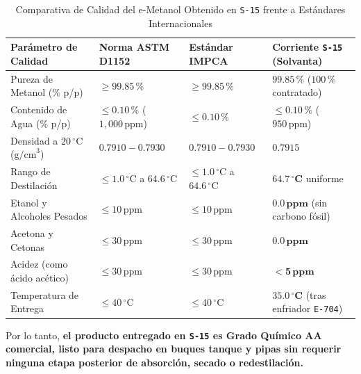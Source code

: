 \documentclass[11pt,a4paper]{article}
\begin{document}
\begin{table}[H]
\centering
\small
\caption{Comparativa de Calidad del e-Metanol Obtenido en \texttt{S-15} frente a Estándares Internacionales}
\label{tab:pureza_metanol}
\begin{tabular}{p{4.5cm} p{3.2cm} p{3.2cm} p{3.5cm}}
\toprule
\textbf{Parámetro de Calidad} & \textbf{Norma ASTM D1152} & \textbf{Estándar IMPCA} & \textbf{Corriente \texttt{S-15} (Solvanta)} \\
\midrule
Pureza de Metanol (\% p/p) & $\ge 99.85\,\%$ & $\ge 99.85\,\%$ & $\mathbf{99.85\,\%}$ ($100\,\%$ contratado) \\
Contenido de Agua (\% p/p) & $\le 0.10\,\%$ ($1{,}000\,\text{ppm}$) & $\le 0.10\,\%$ & $\mathbf{\le 0.10\,\%}$ ($950\,\text{ppm}$) \\
Densidad a $20\,^\circ\text{C}$ ($\text{g/cm}^3$) & $0.7910 - 0.7930$ & $0.7910 - 0.7930$ & $\mathbf{0.7915}$ \\
Rango de Destilación & $\le 1.0\,^\circ\text{C}$ a $64.6\,^\circ\text{C}$ & $\le 1.0\,^\circ\text{C}$ a $64.6\,^\circ\text{C}$ & $\mathbf{64.7\,^\circ\text{C}}$ uniforme \\
Etanol y Alcoholes Pesados & $\le 10\,\text{ppm}$ & $\le 10\,\text{ppm}$ & $\mathbf{0.0\,\text{ppm}}$ (sin carbono fósil) \\
Acetona y Cetonas & $\le 30\,\text{ppm}$ & $\le 30\,\text{ppm}$ & $\mathbf{0.0\,\text{ppm}}$ \\
Acidez (como ácido acético) & $\le 30\,\text{ppm}$ & $\le 30\,\text{ppm}$ & $\mathbf{< 5\,\text{ppm}}$ \\
Temperatura de Entrega & $\le 40\,^\circ\text{C}$ & $\le 40\,^\circ\text{C}$ & $\mathbf{35.0\,^\circ\text{C}}$ (tras enfriador \texttt{E-704}) \\
\bottomrule
\end{tabular}
\end{table}

Por lo tanto, \textbf{el producto entregado en \texttt{S-15} es Grado Químico AA comercial, listo para despacho en buques tanque y pipas sin requerir ninguna etapa posterior de absorción, secado o redestilación.}
\end{document}
